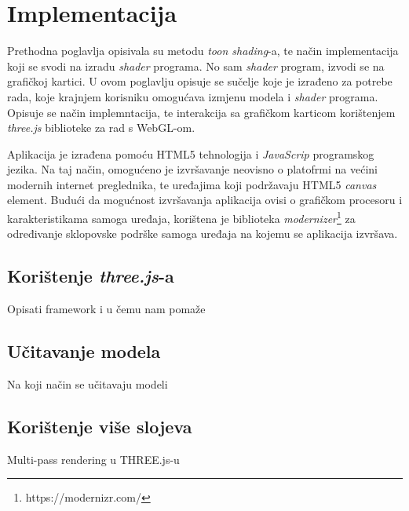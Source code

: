 \section{Implementacija}

Prethodna poglavlja opisivala su metodu \emph{toon shading}-a, te način implementacija koji se svodi na izradu \emph{shader} programa. No sam \emph{shader} program, izvodi se na grafičkoj kartici. U ovom poglavlju opisuje se sučelje koje je izrađeno za potrebe rada, koje krajnjem korisniku omogućava izmjenu modela i \emph{shader} programa. Opisuje se način implemntacija, te interakcija sa grafičkom karticom korištenjem \emph{three.js} biblioteke za rad s WebGL-om.

Aplikacija je izrađena pomoću HTML5 tehnologija i \emph{JavaScrip} programskog jezika. Na taj način, omogućeno je izvršavanje neovisno o platofrmi na većini modernih internet preglednika, te uređajima koji podržavaju HTML5 \emph{canvas} element. Budući da mogućnost izvršavanja aplikacija ovisi o grafičkom procesoru i karakteristikama samoga uređaja, korištena je biblioteka \emph{modernizer}\footnote{https://modernizr.com/} za određivanje sklopovske podrške samoga uređaja na kojemu se aplikacija izvršava.

\subsection{Korištenje \emph{three.js}-a}

Opisati framework i u čemu nam pomaže

\subsection{Učitavanje modela}

Na koji način se učitavaju modeli

\subsection{Korištenje više slojeva}

Multi-pass rendering u THREE.js-u